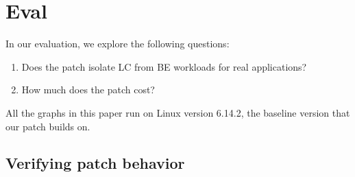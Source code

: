 \section{Eval}
\label{s:eval}

In our evaluation, we explore the following questions:
\begin{enumerate}
    \item Does the patch isolate LC from BE workloads for real applications?
    \item How much does the patch cost?
\end{enumerate}

All the graphs in this paper run on Linux version 6.14.2, the baseline version
that our patch builds on.


\subsection{Verifying patch behavior}

